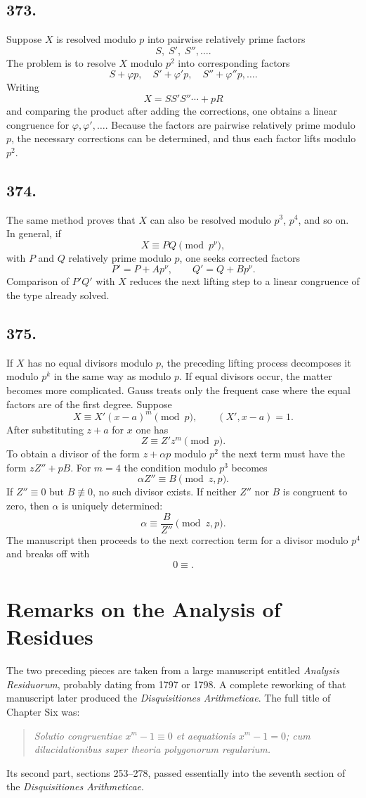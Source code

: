 \documentclass[12pt]{article}
\begin{document}
\subsection*{373.}
Suppose $X$ is resolved modulo $p$ into pairwise relatively prime factors
\[
S,\;S',\;S'',\ldots .
\]
The problem is to resolve $X$ modulo $p^2$ into corresponding factors
\[
S+\varphi p,\quad S'+\varphi' p,\quad S''+\varphi''p,\ldots .
\]
Writing
\[
X=SS'S''\cdots+pR
\]
and comparing the product after adding the corrections, one obtains a linear congruence for $\varphi,\varphi',\ldots$. Because the factors are pairwise relatively prime modulo $p$, the necessary corrections can be determined, and thus each factor lifts modulo $p^2$.

\subsection*{374.}
The same method proves that $X$ can also be resolved modulo $p^3$, $p^4$, and so on. In general, if
\[
X\equiv PQ\pmod{p^\nu},
\]
with $P$ and $Q$ relatively prime modulo $p$, one seeks corrected factors
\[
P'=P+Ap^\nu,\qquad Q'=Q+Bp^\nu .
\]
Comparison of $P'Q'$ with $X$ reduces the next lifting step to a linear congruence of the type already solved.

\subsection*{375.}
If $X$ has no equal divisors modulo $p$, the preceding lifting process decomposes it modulo $p^k$ in the same way as modulo $p$. If equal divisors occur, the matter becomes more complicated. Gauss treats only the frequent case where the equal factors are of the first degree. Suppose
\[
X\equiv X'(x-a)^m\pmod p,\qquad (X',x-a)=1.
\]
After substituting $z+a$ for $x$ one has
\[
Z\equiv Z'z^m\pmod p.
\]
To obtain a divisor of the form $z+\alpha p$ modulo $p^2$ the next term must have the form $zZ''+pB$. For $m=4$ the condition modulo $p^3$ becomes
\[
\alpha Z''\equiv B\pmod{z,p}.
\]
If $Z''\equiv0$ but $B\not\equiv0$, no such divisor exists. If neither $Z''$ nor $B$ is congruent to zero, then $\alpha$ is uniquely determined:
\[
\alpha\equiv \frac{B}{Z''}\pmod{z,p}.
\]
The manuscript then proceeds to the next correction term for a divisor modulo $p^4$ and breaks off with
\[
0\equiv .
\]

\section*{Remarks on the Analysis of Residues}
The two preceding pieces are taken from a large manuscript entitled \emph{Analysis Residuorum}, probably dating from 1797 or 1798. A complete reworking of that manuscript later produced the \emph{Disquisitiones Arithmeticae}. The full title of Chapter Six was:
\begin{quote}
\emph{Solutio congruentiae $x^m-1\equiv 0$ et aequationis $x^m-1=0$; cum dilucidationibus super theoria polygonorum regularium.}
\end{quote}
Its second part, sections 253--278, passed essentially into the seventh section of the \emph{Disquisitiones Arithmeticae}.
\end{document}
